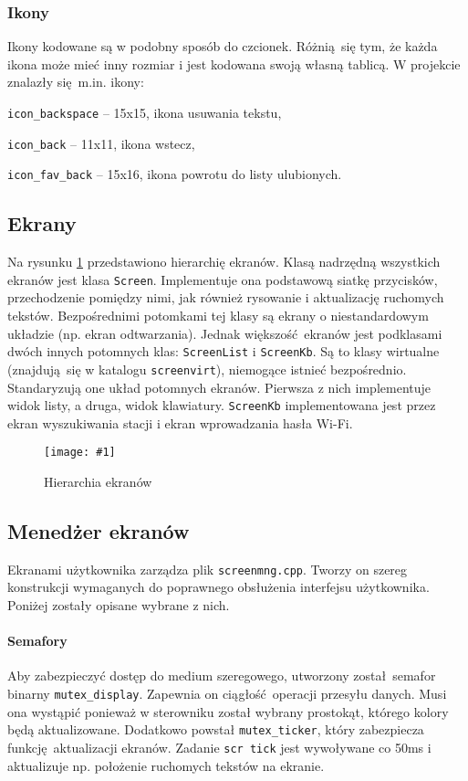 \documentclass[polish]{aghengthesis}
\let\tempone\itemize
\let\temptwo\enditemize
\renewenvironment{itemize}{\tempone\setlength{\itemsep}{0cm}}{\temptwo}
\newcommand{\imgint}[4]{
	\begin{figure}[{#4}]
		\centering
		\texttt{[image: \#1]}
		\caption{#2}
		\label{#1}
	\end{figure}
}
\newcommand{\imgh}[3]{\imgint{#1}{#2}{#3}{H}}
\begin{document}
			\subsubsection{Ikony}
				Ikony kodowane są w podobny sposób do czcionek. Różnią się tym, że każda ikona może mieć inny rozmiar i jest kodowana swoją własną tablicą. W projekcie znalazły się m.in. ikony:
				\begin{itemize}
					\item \lstinline|icon_backspace| -- 15x15, ikona usuwania tekstu,
					\item \lstinline|icon_back| -- 11x11, ikona wstecz,
					\item \lstinline|icon_fav_back| -- 15x16, ikona powrotu do listy ulubionych.
				\end{itemize}
		
		\subsection{Ekrany}
			Na rysunku \ref{3/PicoRadio-screens} przedstawiono hierarchię ekranów. Klasą nadrzędną wszystkich ekranów jest klasa \lstinline|Screen|. Implementuje ona podstawową siatkę przycisków, przechodzenie pomiędzy nimi, jak również rysowanie i aktualizację ruchomych tekstów. Bezpośrednimi potomkami tej klasy są ekrany o niestandardowym układzie (np. ekran odtwarzania). Jednak większość ekranów jest podklasami dwóch innych potomnych klas: \lstinline|ScreenList| i \lstinline|ScreenKb|. Są to klasy wirtualne (znajdują się w katalogu \lstinline|screenvirt|), niemogące istnieć bezpośrednio. Standaryzują one układ potomnych ekranów. Pierwsza z nich implementuje widok listy, a druga, widok klawiatury. \lstinline|ScreenKb| implementowana jest przez ekran wyszukiwania stacji i ekran wprowadzania hasła Wi-Fi.
			
			\imgh{3/PicoRadio-screens}{Hierarchia ekranów}{0.55} %
			
		\subsection{Menedżer ekranów}
			Ekranami użytkownika zarządza plik \lstinline|screenmng.cpp|. Tworzy on szereg konstrukcji wymaganych do poprawnego obsłużenia interfejsu użytkownika. Poniżej zostały opisane wybrane z nich.
			
			\paragraph{Semafory}
				Aby zabezpieczyć dostęp do medium szeregowego, utworzony został semafor binarny \lstinline|mutex_display|. Zapewnia on ciągłość operacji przesyłu danych. Musi ona wystąpić ponieważ w sterowniku został wybrany prostokąt, którego kolory będą aktualizowane. Dodatkowo powstał \lstinline|mutex_ticker|, który zabezpiecza funkcję aktualizacji ekranów. Zadanie \lstinline|scr tick| jest wywoływane co 50ms i aktualizuje np. położenie ruchomych tekstów na ekranie.
				
\end{document}
